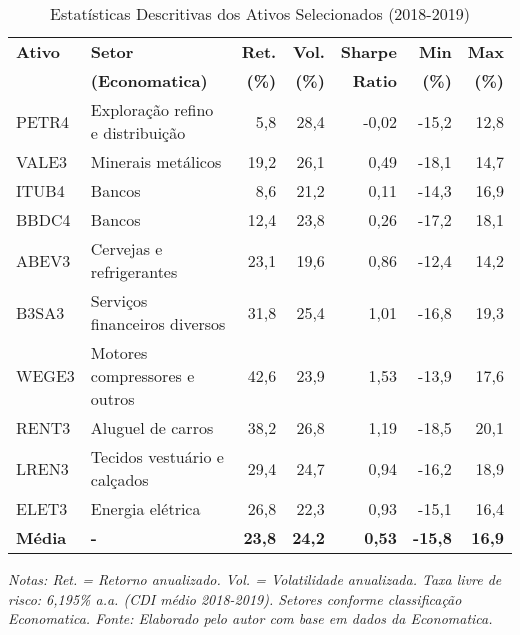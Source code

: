 \begin{table}[H]
\centering
\caption{Estatísticas Descritivas dos Ativos Selecionados (2018-2019)}
\scriptsize
\begin{tabular}{|l|p{2.5cm}|r|r|r|r|r|}
\hline
\textbf{Ativo} & \textbf{Setor} & \textbf{Ret.} & \textbf{Vol.} & \textbf{Sharpe} & \textbf{Min} & \textbf{Max} \\
& \textbf{(Economatica)} & \textbf{(\%)} & \textbf{(\%)} & \textbf{Ratio} & \textbf{(\%)} & \textbf{(\%)} \\
\hline
PETR4 & Exploração refino e distribuição & 5,8 & 28,4 & -0,02 & -15,2 & 12,8 \\
\hline
VALE3 & Minerais metálicos & 19,2 & 26,1 & 0,49 & -18,1 & 14,7 \\
\hline
ITUB4 & Bancos & 8,6 & 21,2 & 0,11 & -14,3 & 16,9 \\
\hline
BBDC4 & Bancos & 12,4 & 23,8 & 0,26 & -17,2 & 18,1 \\
\hline
ABEV3 & Cervejas e refrigerantes & 23,1 & 19,6 & 0,86 & -12,4 & 14,2 \\
\hline
B3SA3 & Serviços financeiros diversos & 31,8 & 25,4 & 1,01 & -16,8 & 19,3 \\
\hline
WEGE3 & Motores compressores e outros & 42,6 & 23,9 & 1,53 & -13,9 & 17,6 \\
\hline
RENT3 & Aluguel de carros & 38,2 & 26,8 & 1,19 & -18,5 & 20,1 \\
\hline
LREN3 & Tecidos vestuário e calçados & 29,4 & 24,7 & 0,94 & -16,2 & 18,9 \\
\hline
ELET3 & Energia elétrica & 26,8 & 22,3 & 0,93 & -15,1 & 16,4 \\
\hline
\textbf{Média} & \textbf{-} & \textbf{23,8} & \textbf{24,2} & \textbf{0,53} & \textbf{-15,8} & \textbf{16,9} \\
\hline
\end{tabular}
\normalsize
\vspace{0.5cm}

\textit{Notas: Ret. = Retorno anualizado. Vol. = Volatilidade anualizada. Taxa livre de risco: 6,195\% a.a. (CDI médio 2018-2019). Setores conforme classificação Economatica. Fonte: Elaborado pelo autor com base em dados da Economatica.}
\label{tab:descriptive_stats}
\end{table}
